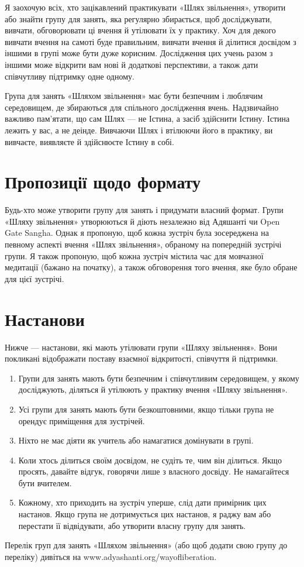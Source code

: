 Я заохочую всіх, хто зацікавлений практикувати «Шлях звільнення», утворити або знайти групу для занять, яка регулярно збирається, щоб досліджувати, вивчати, обговорювати ці вчення й утілювати їх у практику. Хоч для декого вивчати вчення на самоті буде правильним, вивчати вчення й ділитися досвідом з іншими в групі може бути дуже корисним. Дослідження цих учень разом з іншими може відкрити вам нові й додаткові перспективи, а також дати співчутливу підтримку одне одному.

Група для занять «Шляхом звільнення» має бути безпечним і люблячим середовищем, де збираються для спільного дослідження вчень. Надзвичайно важливо пам'ятати, що сам Шлях — не Істина, а засіб здійснити Істину. Істина лежить у вас, а не деінде. Вивчаючи Шлях і втілюючи його в практику, ви вивчаєте, виявляєте й здійснюєте Істину в собі.

\section*{Пропозиції щодо формату}

Будь-хто може утворити групу для занять і придумати власний формат. Групи «Шляху звільнення» утворюються й діють незалежно від Адяшанті чи Open Gate Sangha. Однак я пропоную, щоб кожна зустріч була зосереджена на певному аспекті вчення «Шлях звільнення», обраному на попередній зустрічі групи. Я також пропоную, щоб кожна зустріч містила час для мовчазної медитації (бажано на початку), а також обговорення того вчення, яке було обране для цієї зустрічі.

\section*{Настанови}

Нижче — настанови, які мають утілювати групи «Шляху звільнення». Вони покликані відображати поставу взаємної відкритості, співчуття й підтримки.

\begin{enumerate}
\item Групи для занять мають бути безпечним і співчутливим середовищем, у якому досліджують, діляться й утілюють у практику вчення «Шляху звільнення».
\item Усі групи для занять мають бути безкоштовними, якщо тільки група не орендує приміщення для зустрічей.
\item Ніхто не має діяти як учитель або намагатися домінувати в групі.
\item Коли хтось ділиться своїм досвідом, не судіть те, чим він ділиться. Якщо просять, давайте відгук, говорячи лише з власного досвіду. Не намагайтеся бути вчителем.
\item Кожному, хто приходить на зустріч уперше, слід дати примірник цих настанов. Якщо група не дотримується цих настанов, я раджу вам або перестати її відвідувати, або утворити власну групу для занять.
\end{enumerate}

Перелік груп для занять «Шляхом звільнення» (або щоб додати свою групу до переліку) дивіться на www.adyashanti.org/wayofliberation.

